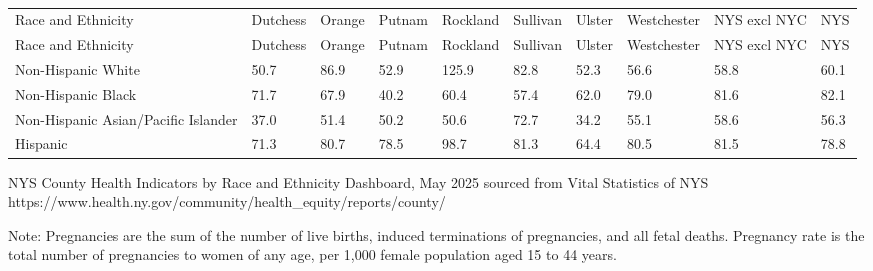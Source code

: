 \documentclass[
  english,
  letterpaper,
]{report}
\begin{document}
\begin{longtable}[]{@{}llllllllll@{}}

\caption{\label{tbl-15to44-preg-rate-rande}Pregnancy, Rate per 1,000
Female Population 15--44 Years Old by Race and Ethnicity, 2020--2022}

\tabularnewline

\caption{}\label{T_61390}\tabularnewline
\toprule\noalign{}
Race and Ethnicity & Dutchess & Orange & Putnam & Rockland & Sullivan &
Ulster & Westchester & NYS excl NYC & NYS \\
\midrule\noalign{}
\endfirsthead
\toprule\noalign{}
Race and Ethnicity & Dutchess & Orange & Putnam & Rockland & Sullivan &
Ulster & Westchester & NYS excl NYC & NYS \\
\midrule\noalign{}
\endhead
\bottomrule\noalign{}
\endlastfoot
Non-Hispanic White & 50.7 & 86.9 & 52.9 & 125.9 & 82.8 & 52.3 & 56.6 &
58.8 & 60.1 \\
Non-Hispanic Black & 71.7 & 67.9 & 40.2 & 60.4 & 57.4 & 62.0 & 79.0 &
81.6 & 82.1 \\
Non-Hispanic Asian/Pacific Islander & 37.0 & 51.4 & 50.2 & 50.6 & 72.7 &
34.2 & 55.1 & 58.6 & 56.3 \\
Hispanic & 71.3 & 80.7 & 78.5 & 98.7 & 81.3 & 64.4 & 80.5 & 81.5 &
78.8 \\

\end{longtable}

\begin{tcolorbox}[enhanced jigsaw, breakable, leftrule=.75mm, title=\textcolor{quarto-callout-note-color}{\faInfo}\hspace{0.5em}{Source}, bottomrule=.15mm, opacityback=0, left=2mm, colback=white, bottomtitle=1mm, coltitle=black, colbacktitle=quarto-callout-note-color!10!white, colframe=quarto-callout-note-color-frame, opacitybacktitle=0.6, toptitle=1mm, titlerule=0mm, arc=.35mm, rightrule=.15mm, toprule=.15mm]

NYS County Health Indicators by Race and Ethnicity Dashboard, May 2025
sourced from Vital Statistics of NYS
https://www.health.ny.gov/community/health\_equity/reports/county/

\end{tcolorbox}

\begin{tcolorbox}[enhanced jigsaw, breakable, leftrule=.75mm, title=\textcolor{quarto-callout-note-color}{\faInfo}\hspace{0.5em}{Note}, bottomrule=.15mm, opacityback=0, left=2mm, colback=white, bottomtitle=1mm, coltitle=black, colbacktitle=quarto-callout-note-color!10!white, colframe=quarto-callout-note-color-frame, opacitybacktitle=0.6, toptitle=1mm, titlerule=0mm, arc=.35mm, rightrule=.15mm, toprule=.15mm]

Note: Pregnancies are the sum of the number of live births, induced
terminations of pregnancies, and all fetal deaths. Pregnancy rate is the
total number of pregnancies to women of any age, per 1,000 female
population aged 15 to 44 years.

\end{tcolorbox}
\end{document}
